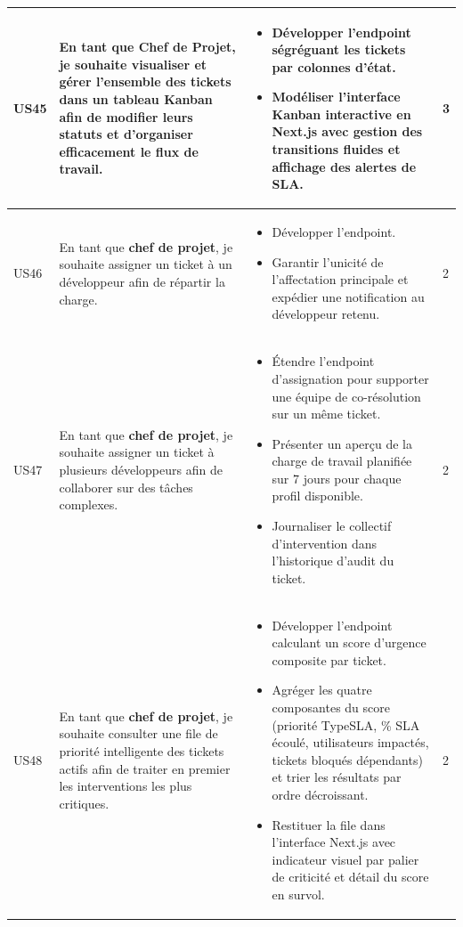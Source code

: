 \begin{longtable}{|C{1cm}|L{5.6cm}|L{8cm}|C{0.85cm}|}
US45 & En tant que \textbf{Chef de Projet}, je souhaite visualiser et gérer l'ensemble des tickets dans un tableau Kanban afin de modifier leurs statuts et d'organiser efficacement le flux de travail. &
\begin{itemize}[nosep, left=0pt, label={$\bullet$}]
\item Développer l'endpoint ségréguant les tickets par colonnes d'état.
\item Modéliser l'interface Kanban interactive en Next.js avec gestion des transitions fluides et affichage des alertes de SLA.
\end{itemize} & 3 \\
\hline

US46 & En tant que \textbf{chef de projet}, je souhaite assigner un ticket à un développeur afin de répartir la charge. &
\begin{itemize}[nosep, left=0pt, label={$\bullet$}]
\item Développer l'endpoint.
\item Garantir l'unicité de l'affectation principale et expédier une notification au développeur retenu.
\end{itemize} & 2 \\
\hline

US47 & En tant que \textbf{chef de projet}, je souhaite assigner un ticket à plusieurs développeurs afin de collaborer sur des tâches complexes. &
\begin{itemize}[nosep, left=0pt, label={$\bullet$}]
\item Étendre l'endpoint d'assignation pour supporter une équipe de co-résolution sur un même ticket.
\item Présenter un aperçu de la charge de travail planifiée sur 7 jours pour chaque profil disponible.
\item Journaliser le collectif d'intervention dans l'historique d'audit du ticket.
\end{itemize} & 2 \\
\hline

US48 & En tant que \textbf{chef de projet}, je souhaite consulter une file de priorité intelligente des tickets actifs afin de traiter en premier les interventions les plus critiques. &
\begin{itemize}[nosep, left=0pt, label={$\bullet$}]
\item Développer l'endpoint calculant un score d'urgence composite par ticket.
\item Agréger les quatre composantes du score (priorité TypeSLA, \% SLA écoulé, utilisateurs impactés, tickets bloqués dépendants) et trier les résultats par ordre décroissant.
\item Restituer la file dans l'interface Next.js avec indicateur visuel par palier de criticité et détail du score en survol.
\end{itemize} & 2 \\
\hline


\end{longtable}
